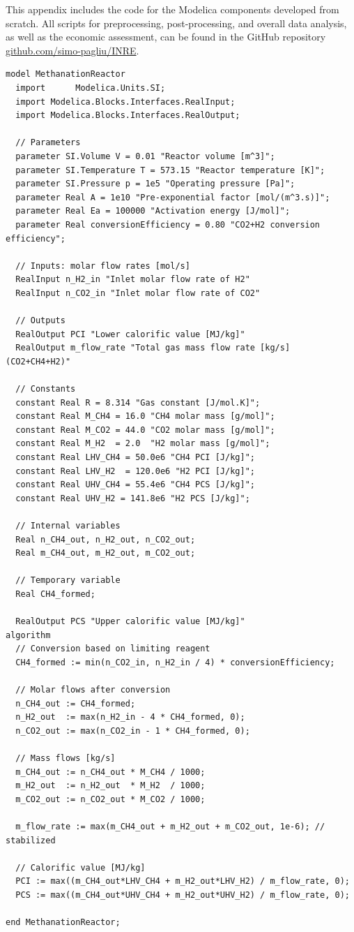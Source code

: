 This appendix includes the code for the Modelica components developed from scratch. All scripts for preprocessing, post-processing, and overall data analysis, as well as the economic assessment, can be found in the GitHub repository \url{github.com/simo-pagliu/INRE}.

\begin{lstlisting}[language=Modelica, caption= Methanation Reactor]
model MethanationReactor
  import      Modelica.Units.SI;
  import Modelica.Blocks.Interfaces.RealInput;
  import Modelica.Blocks.Interfaces.RealOutput;

  // Parameters
  parameter SI.Volume V = 0.01 "Reactor volume [m^3]";
  parameter SI.Temperature T = 573.15 "Reactor temperature [K]";
  parameter SI.Pressure p = 1e5 "Operating pressure [Pa]";
  parameter Real A = 1e10 "Pre-exponential factor [mol/(m^3.s)]";
  parameter Real Ea = 100000 "Activation energy [J/mol]";
  parameter Real conversionEfficiency = 0.80 "CO2+H2 conversion efficiency";

  // Inputs: molar flow rates [mol/s]
  RealInput n_H2_in "Inlet molar flow rate of H2"
  RealInput n_CO2_in "Inlet molar flow rate of CO2"

  // Outputs
  RealOutput PCI "Lower calorific value [MJ/kg]"
  RealOutput m_flow_rate "Total gas mass flow rate [kg/s] (CO2+CH4+H2)"

  // Constants
  constant Real R = 8.314 "Gas constant [J/mol.K]";
  constant Real M_CH4 = 16.0 "CH4 molar mass [g/mol]";
  constant Real M_CO2 = 44.0 "CO2 molar mass [g/mol]";
  constant Real M_H2  = 2.0  "H2 molar mass [g/mol]";
  constant Real LHV_CH4 = 50.0e6 "CH4 PCI [J/kg]";
  constant Real LHV_H2  = 120.0e6 "H2 PCI [J/kg]";
  constant Real UHV_CH4 = 55.4e6 "CH4 PCS [J/kg]";
  constant Real UHV_H2 = 141.8e6 "H2 PCS [J/kg]";

  // Internal variables
  Real n_CH4_out, n_H2_out, n_CO2_out;
  Real m_CH4_out, m_H2_out, m_CO2_out;

  // Temporary variable
  Real CH4_formed;

  RealOutput PCS "Upper calorific value [MJ/kg]"
algorithm 
  // Conversion based on limiting reagent
  CH4_formed := min(n_CO2_in, n_H2_in / 4) * conversionEfficiency;

  // Molar flows after conversion
  n_CH4_out := CH4_formed;
  n_H2_out  := max(n_H2_in - 4 * CH4_formed, 0);
  n_CO2_out := max(n_CO2_in - 1 * CH4_formed, 0);

  // Mass flows [kg/s]
  m_CH4_out := n_CH4_out * M_CH4 / 1000;
  m_H2_out  := n_H2_out  * M_H2  / 1000;
  m_CO2_out := n_CO2_out * M_CO2 / 1000;

  m_flow_rate := max(m_CH4_out + m_H2_out + m_CO2_out, 1e-6); // stabilized

  // Calorific value [MJ/kg]
  PCI := max((m_CH4_out*LHV_CH4 + m_H2_out*LHV_H2) / m_flow_rate, 0);
  PCS := max((m_CH4_out*UHV_CH4 + m_H2_out*UHV_H2) / m_flow_rate, 0);

end MethanationReactor;

\end{lstlisting}
